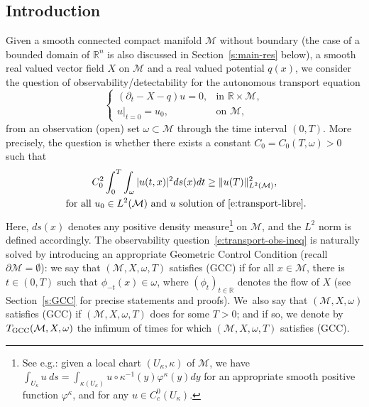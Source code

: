 \documentclass[10pt]{amsart}
\newcommand{\GCC}{\textup{GCC}}
\newcommand{\pGCC}{\textup{(GCC)}\xspace}
\theoremstyle{definition}
\newcommand{\M}{\ensuremath{\mathcal M}}
\newcommand{\mb}[1]{\ensuremath{\mathbb{#1}}}
\newcommand{\R}{{\mb{R}}}
\let\d\partial
\let\q q
\providecommand{\eg}{e.g.}\providecommand{\ie}{i.e.}\providecommand{\etc}{etc.}
\begin{document}
\subsection{Introduction}
\label{s:intro-intro}
Given a smooth connected compact manifold $\M$ without boundary (the case of a bounded domain of $\R^n$ is also discussed in Section~\ref{s:main-res} below), a smooth real valued vector field $X$ on $\M$ and a real valued potential $\q(x)$, we consider the question of observability/detectability for the autonomous transport equation
\begin{equation}
\label{e:transport-libre}
\begin{cases}
(\d_t - X-\q) u = 0, & \text{in } \R\times \M, \\
u|_{t=0} = u_0, & \text{on } \M,
\end{cases}
\end{equation}
from an observation (open) set $\omega \subset \M$ through the time interval $(0,T)$. More precisely, the question is whether there exists a constant $C_0=C_0(T,\omega)>0$ such that
\begin{multline}
\label{e:transport-obs-ineq}
C_0^2 \int_0^T\int_\omega |u(t,x)|^2 ds(x)dt \geq \|u (T)\|_{L^2(\M)}^2, \\
\text{ for all } u_0 \in L^2(\M) \text{ and } u \text{ solution of~\eqref{e:transport-libre}}.
\end{multline}
Here, $ds(x)$ denotes any positive density measure\footnote{See \eg \cite[Chap.\,16 p.\,427]{Lee:book}: given a local chart $(U_\kappa, \kappa)$ of $\M$, we have $\int_{U_\kappa} u \ ds= \int_{\kappa(U_\kappa)} u\circ \kappa^{-1}(y) \varphi^\kappa(y) dy$ for an appropriate smooth positive function $\varphi^\kappa$, and for any $u \in C^0_c(U_\kappa)$.} on $\M$, and the $L^2$ norm is defined accordingly.
The observability question~\eqref{e:transport-obs-ineq} is naturally solved by introducing an appropriate Geometric Control Condition (recall $\d\M=\emptyset$): we say that $(\M,X,\omega,T)$ satisfies \pGCC if for all $x\in \M$, there is $t \in (0,T)$ such that $\phi_{-t}(x)\in \omega$, where $(\phi_t)_{t\in\R}$ denotes the flow of $X$ (see Section~\ref{s:GCC} for precise statements and proofs). We~also say that $(\M,X,\omega)$ satisfies \pGCC if $(\M,X,\omega,T)$ does for some $T>0$; and if so, we denote by $T_{\GCC}(\M,X,\omega)$ the infimum of times for which $(\M,X,\omega,T)$ satisfies \pGCC.
\end{document}

